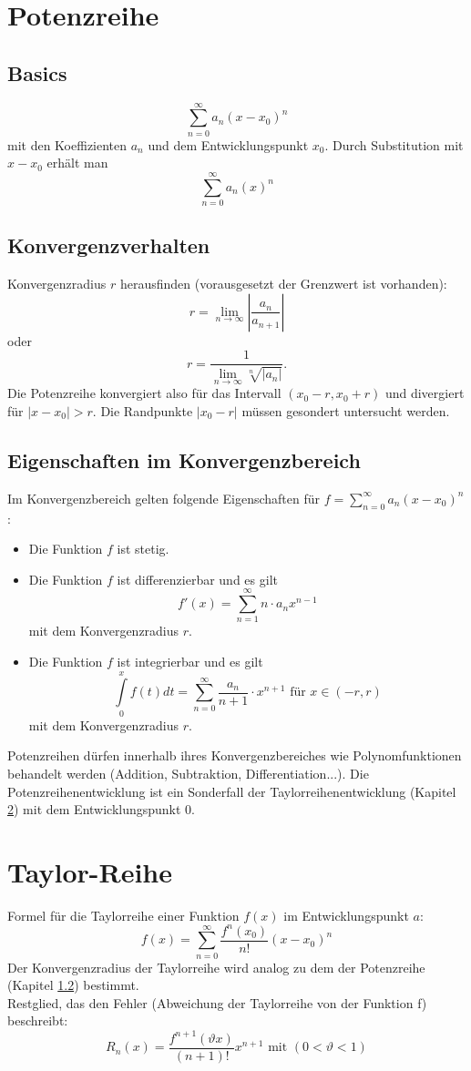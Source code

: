 \documentclass[12pt,a4paper]{article}
\begin{document}
\section{Potenzreihe}
\subsection{Basics}
\[\sum\limits_{n=0}^{\infty}{a_n(x-x_0)^n}\]
mit den Koeffizienten $a_n$ und dem Entwicklungspunkt $x_0$. Durch Substitution mit $x-x_0$ erhält man
\[\sum\limits_{n=0}^{\infty}{a_n(x)^n}\]

\subsection{Konvergenzverhalten}\label{ptr}
Konvergenzradius $r$ herausfinden (vorausgesetzt der Grenzwert ist vorhanden):
\[r = \lim\limits_{n \to \infty}{\left|\frac{a_n}{a_{n+1}}\right|}\]
oder
\[r = \frac{1}{\lim\limits_{n \to \infty}{\sqrt[n]{\left| a_n \right|}}}\text{.}\]
Die Potenzreihe konvergiert also für das Intervall $(x_0 - r, x_0 + r)$ und divergiert für $\left| x - x_0 \right| > r$. Die Randpunkte $\left| x_0 - r \right|$ müssen gesondert untersucht werden.

\subsection{Eigenschaften im Konvergenzbereich}
Im Konvergenzbereich gelten folgende Eigenschaften für $ f= \sum\limits_{n=0}^{\infty}{a_n(x-x_0)^n}$:
\begin{itemize}
\item
Die Funktion $f$ ist stetig.
\item
Die Funktion $f$ ist differenzierbar und es gilt
\[f'(x) = \sum\limits_{n=1}^{\infty}{n \cdot a_n x^{n-1}}\]
mit dem Konvergenzradius $r$.
\item
Die Funktion $f$ ist integrierbar und es gilt
\[\int\limits_0^x{f(t)dt} = \sum\limits_{n=0}^{\infty}{\frac{a_n}{n+1} \cdot x^{n+1}}\text{ für } x \in (-r,r)\]
mit dem Konvergenzradius $r$.
\end{itemize}
Potenzreihen dürfen innerhalb ihres Konvergenzbereiches wie Polynomfunktionen behandelt werden (Addition, Subtraktion, Differentiation...).
Die Potenzreihenentwicklung ist ein Sonderfall der Taylorreihenentwicklung (Kapitel  \ref{tlr}) mit dem Entwicklungspunkt 0.

\section{Taylor-Reihe}\label{tlr}
Formel für die Taylorreihe einer Funktion $f(x)$ im Entwicklungspunkt $a$:
\[f(x) = \sum\limits_{n=0}^{\infty}{\frac{f^n(x_0)}{n!}(x-x_0)^n}\]
Der Konvergenzradius der Taylorreihe wird analog zu dem der Potenzreihe (Kapitel \ref{ptr}) bestimmt.\\
Restglied, das den Fehler (Abweichung der Taylorreihe von der Funktion f) beschreibt:
\[R_n(x) = \frac{f^{n+1}(\vartheta x)}{(n+1)!}x^{n+1} \text{ mit } (0<\vartheta<1)\]
\end{document}
